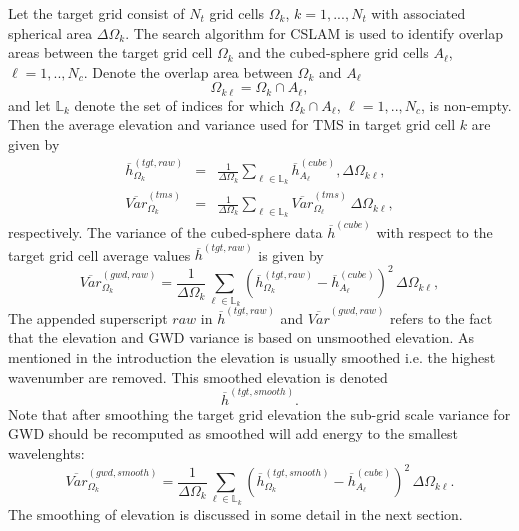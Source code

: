 \documentclass[gmd]{copernicus}
\begin{document}
Let the target grid consist of $N_t$ grid cells $\Omega_k$, $k=1, ..., N_t$ with associated spherical area $\Delta \Omega_k$. The search algorithm for CSLAM is used to identify overlap areas between the target grid cell $\Omega_k$ and the cubed-sphere grid cells $A_\ell$, $\ell=1,..,N_c$. Denote the overlap area between $\Omega_k$ and $A_\ell$
\begin{equation}
\Omega_{k\ell}=\Omega_k \cap A_\ell,
\end{equation}
and let $\mathbb{L}_k$ denote the set of indices for which $\Omega_k \cap A_\ell$, $\ell=1,..,N_c$, is non-empty. Then the average elevation and variance used for TMS in target grid cell $k$ are given by
\begin{eqnarray}
\overline{h}^{(tgt,raw)}_{\Omega_k}&=&\frac{1}{\Delta \Omega_k}\sum_{\ell\in {\mathbb{L}}_k}\overline{h}_{A_\ell}^{(cube)}, \Delta \Omega_{k\ell},\\
\overline{Var}^{(tms)}_{\Omega_k}&=&\frac{1}{\Delta \Omega_k}\sum_{\ell\in {\mathbb{L}}_k}\overline{Var}^{(tms)}_{\Omega_\ell}\, \Delta \Omega_{k\ell},
\end{eqnarray}
respectively. The variance of the cubed-sphere data $\overline{h}^{(cube)}$ with respect to the target grid cell average values $\overline{h}^{(tgt,raw)}$ is given by
\begin{equation}
\overline{Var}^{(gwd,raw)}_{\Omega_k}=\frac{1}{\Delta \Omega_k}\sum_{\ell\in {\mathbb{L}}_k}\left( \overline{h}^{(tgt,raw)}_{\Omega_k}-\overline{h}^{(cube)}_{A_\ell}\right)^2\, \Delta \Omega_{k\ell},
\end{equation}
The appended superscript $raw$ in $\overline{h}^{(tgt,raw)}$ and $\overline{Var}^{(gwd,raw)}$ refers to the fact that the elevation and GWD variance is based on unsmoothed elevation. As mentioned in the introduction the elevation is usually smoothed i.e. the highest wavenumber are removed. This smoothed elevation is denoted
\begin{equation}
\overline{h}^{(tgt,smooth)}.
\end{equation}
Note that after smoothing the target grid elevation the sub-grid scale variance for GWD should be recomputed as smoothed will add energy to the smallest wavelenghts:
\begin{equation}
\overline{Var}^{(gwd,smooth)}_{\Omega_k}=\frac{1}{\Delta \Omega_k}\sum_{\ell\in {\mathbb{L}}_k}\left( \overline{h}^{(tgt,smooth)}_{\Omega_k}-\overline{h}^{(cube)}_{A_\ell}\right)^2\, \Delta \Omega_{k\ell}.\label{eq:gwd-smooth}
\end{equation}
The smoothing of elevation is discussed in some detail in the next section.
\end{document}
